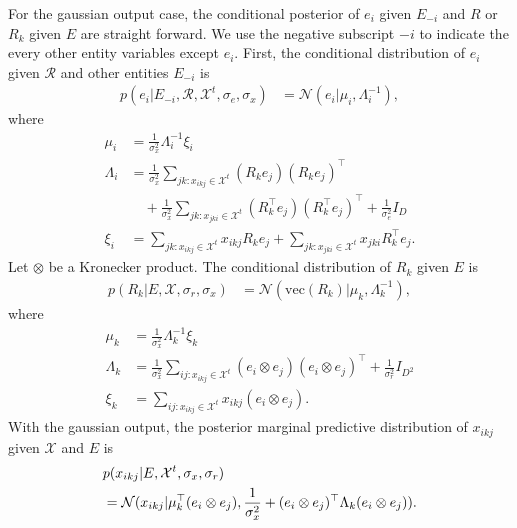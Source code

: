 For the gaussian output case, the conditional posterior of $e_i$ given $E_{-i}$ 
and $R$ or $R_k$ given $E$ are straight forward. We use the negative subscript $-
i$ to indicate the every other entity variables except $e_i$. First, the 
conditional distribution of $e_i$ given $\mathcal{R}$ and other entities $E_{-i}$ 
is
\begin{align} \label{eqn:sample_e}
p(e_i |E_{-i}, \mathcal{R}, \mathcal{X}^{t}, \sigma_e, \sigma_x) &= \mathcal{N}
(e_i | \mu_i, \Lambda_i^{-1}),
\end{align}
where
\begin{align*}
\mu_i &= \frac{1}{\sigma_x^2}\Lambda_i^{-1}\xi_i \\
\Lambda_i &= \frac{1}{\sigma_x^2} \sum_{jk : x_{ikj} \in \mathcal{X}^{t}} (R_k 
e_j)(R_k e_j)^\top \\
&\quad+ \frac{1}{\sigma_x^2} \sum_{jk : x_{jki} \in \mathcal{X}^{t}} (R_k^\top 
e_j)(R_k^\top e_j)^\top+ \frac{1}{\sigma_e^2} {I}_D \\
\xi_i &= \sum_{jk : x_{ikj} \in \mathcal{X}^{t}}  x_{ikj} R_{k} e_{j} + 
\sum_{jk : x_{jki} \in \mathcal{X}^{t}} x_{jki} R_{k}^\top e_{j}.
\end{align*}
Let $\otimes$ be a Kronecker product. The conditional distribution of $R_k$ given 
$E$ is
\begin{align}
\label{eqn:sample_r}
p(R_k|E, \mathcal{X}, \sigma_r, \sigma_x)  &= \mathcal{N}(\text{vec}(R_k) | 
\mu_k, \Lambda_k^{-1}),
\end{align}
where
\begin{align*}
\mu_k &= \frac{1}{\sigma_x^2}\Lambda_k^{-1}\xi_k \\
\Lambda_k &= \frac{1}{\sigma_x^2} \sum_{ij:x_{ikj} \in \mathcal{X}^{t}} (e_i 
\otimes e_j)(e_i \otimes e_j)^\top + \frac{1}{\sigma_r^2} {I}_{D^2} \\
\xi_k &= \sum_{ij:x_{ikj} \in \mathcal{X}^{t}} x_{ikj} (e_{i} \otimes e_{j}).
\end{align*}
With the gaussian output, the posterior marginal predictive distribution of 
$x_{ikj}$ given $\mathcal{X}$ and $E$ is
\begin{align}
\label{eqn:marginal_predict}
&p(x_{ikj}| E, \mathcal{X}^{t}, \sigma_x, \sigma_r) \\
&= \mathcal{N}(x_{ikj}| \mu_k ^\top (e_i \otimes e_j), \frac{1}{\sigma_x^2} +  
(e_i \otimes e_j)^\top \Lambda_k (e_i \otimes e_j)). \notag
\end{align}
